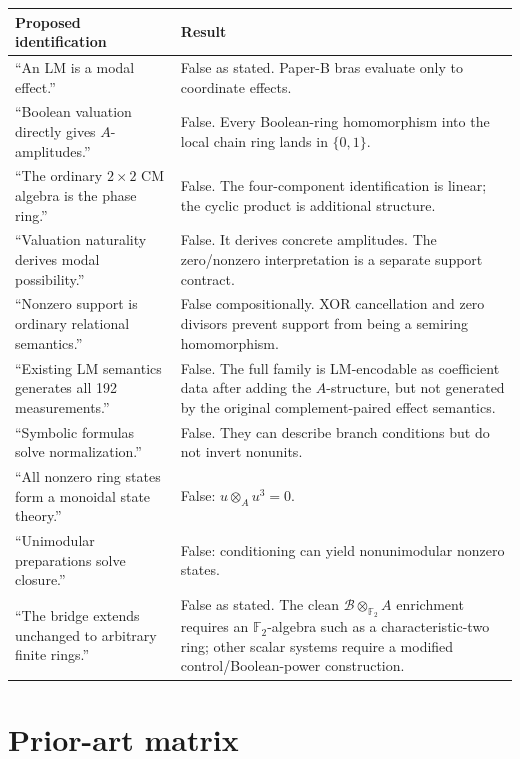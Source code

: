 \documentclass[11pt]{article}
\theoremstyle{definition}
\newcommand{\F}{\mathbb{F}}
\newcommand{\B}{\mathcal{B}}
\begin{document}
\begin{longtable}{p{}p{}}
\toprule
\textbf{Proposed identification} & \textbf{Result} \\
\midrule
\endhead
``An LM is a modal effect.'' & False as stated. Paper-B bras evaluate only to coordinate effects.\\
\addlinespace
``Boolean valuation directly gives \(A\)-amplitudes.'' & False. Every Boolean-ring homomorphism into the local chain ring lands in \(\{0,1\}\).\\
\addlinespace
``The ordinary \(2\times2\) CM algebra is the phase ring.'' & False. The four-component identification is linear; the cyclic product is additional structure.\\
\addlinespace
``Valuation naturality derives modal possibility.'' & False. It derives concrete amplitudes. The zero/nonzero interpretation is a separate support contract.\\
\addlinespace
``Nonzero support is ordinary relational semantics.'' & False compositionally. XOR cancellation and zero divisors prevent support from being a semiring homomorphism.\\
\addlinespace
``Existing LM semantics generates all 192 measurements.'' & False. The full family is LM-encodable as coefficient data after adding the \(A\)-structure, but not generated by the original complement-paired effect semantics.\\
\addlinespace
``Symbolic formulas solve normalization.'' & False. They can describe branch conditions but do not invert nonunits.\\
\addlinespace
``All nonzero ring states form a monoidal state theory.'' & False: \(u\otimes_Au^3=0\).\\
\addlinespace
``Unimodular preparations solve closure.'' & False: conditioning can yield nonunimodular nonzero states.\\
\addlinespace
``The bridge extends unchanged to arbitrary finite rings.'' & False as stated. The clean \(\B\otimes_{\F_2}A\) enrichment requires an \(\F_2\)-algebra such as a characteristic-two ring; other scalar systems require a modified control/Boolean-power construction.\\
\bottomrule
\end{longtable}

\section{Prior-art matrix}
\end{document}
